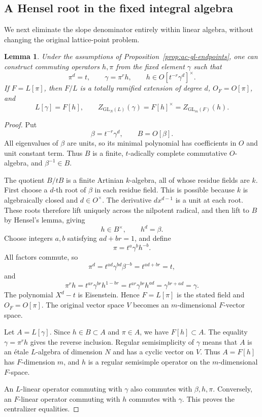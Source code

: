 \documentclass[11pt,a4paper]{article}
\newtheorem{lemma}[theorem]{Lemma}
\theoremstyle{definition}
\theoremstyle{remark}
\begin{document}
\subsection{A Hensel root in the fixed integral algebra}

We next eliminate the slope denominator entirely within linear algebra,
without changing the original lattice-point problem.

\begin{lemma}\label{lem:ac-hensel-root}
Under the assumptions of Proposition~\ref{prop:ac-gl-endpoints}, one can
construct commuting operators \(h,\pi\) from the fixed element \(\gamma\)
such that
\[
\pi^d=t,\qquad \gamma=\pi^r h,\qquad
h\in O[t^{-r}\gamma^d]^\times.
\]
If \(F=L[\pi]\), then \(F/L\) is a totally ramified extension of degree
\(d\), \(O_F=O[\pi]\), and
\[
L[\gamma]=F[h],\qquad
Z_{\mathrm{GL}_N(L)}(\gamma)=F[h]^\times
=Z_{\mathrm{GL}_m(F)}(h).
\]
\end{lemma}

\begin{proof}
Put
\[
\beta=t^{-r}\gamma^d,\qquad B=O[\beta].
\]
All eigenvalues of \(\beta\) are units, so its minimal polynomial has
coefficients in \(O\) and unit constant term. Thus \(B\) is a finite,
\(t\)-adically complete commutative \(O\)-algebra, and
\(\beta^{-1}\in B\).

The quotient \(B/tB\) is a finite Artinian \(k\)-algebra, all of whose
residue fields are \(k\). First choose a \(d\)-th root of \(\beta\) in each
residue field. This is possible because \(k\) is algebraically closed and
\(d\in O^\times\). The derivative \(d x^{d-1}\) is a unit at each root.
These roots therefore lift uniquely across the nilpotent radical, and
then lift to \(B\) by Hensel's lemma, giving
\[
h\in B^\times,\qquad h^d=\beta.
\]
Choose integers \(a,b\) satisfying \(ad+br=1\), and define
\[
\pi=t^a\gamma^b h^{-b}.
\]
All factors commute, so
\[
\pi^d=t^{ad}\gamma^{bd}\beta^{-b}
=t^{ad+br}=t,
\]
and
\[
\pi^r h=t^{ar}\gamma^{br}h^{1-br}
=t^{ar}\gamma^{br}h^{ad}
=\gamma^{br+ad}=\gamma.
\]
The polynomial \(X^d-t\) is Eisenstein. Hence \(F=L[\pi]\) is the stated
field and \(O_F=O[\pi]\). The original vector space \(V\) becomes an
\(m\)-dimensional \(F\)-vector space.

Let \(A=L[\gamma]\). Since \(h\in B\subset A\) and \(\pi\in A\), we have
\(F[h]\subset A\). The equality \(\gamma=\pi^r h\) gives the reverse
inclusion. Regular semisimplicity of \(\gamma\) means that \(A\) is an
\'etale \(L\)-algebra of dimension \(N\) and has a cyclic vector on \(V\).
Thus \(A=F[h]\) has \(F\)-dimension \(m\), and \(h\) is a regular
semisimple operator on the \(m\)-dimensional \(F\)-space.

An \(L\)-linear operator commuting with \(\gamma\) also commutes with
\(\beta,h,\pi\). Conversely, an \(F\)-linear operator commuting with \(h\)
commutes with \(\gamma\). This proves the centralizer equalities.
\end{proof}
\end{document}
